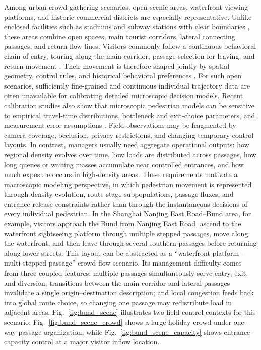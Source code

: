 \documentclass[lettersize,journal]{IEEEtran}
\begin{document}
Among urban crowd-gathering scenarios, open scenic areas, waterfront viewing platforms, and historic commercial districts are especially representative. Unlike enclosed facilities such as stadiums and subway stations with clear boundaries \cite{RN761,RN2194}, these areas combine open spaces, main tourist corridors, lateral connecting passages, and return flow lines. Visitors commonly follow a continuous behavioral chain of entry, touring along the main corridor, passage selection for leaving, and return movement \cite{RN2301}. Their movement is therefore shaped jointly by spatial geometry, control rules, and historical behavioral preferences \cite{RN2303}. For such open scenarios, sufficiently fine-grained and continuous individual trajectory data are often unavailable for calibrating detailed microscopic decision models. Recent calibration studies also show that microscopic pedestrian models can be sensitive to empirical travel-time distributions, bottleneck and exit-choice parameters, and measurement-error assumptions \cite{kretz2026empirical_travel_time_calibration,haghani2024crowd_model_calibration,king2023measurement_errors_destination_choice}. Field observations may be fragmented by camera coverage, occlusion, privacy restrictions, and changing temporary-control layouts. In contrast, managers usually need aggregate operational outputs: how regional density evolves over time, how loads are distributed across passages, how long queues or waiting masses accumulate near controlled entrances, and how much exposure occurs in high-density areas. These requirements motivate a macroscopic modeling perspective, in which pedestrian movement is represented through density evolution, route-stage subpopulations, passage fluxes, and entrance-release constraints rather than through the instantaneous decisions of every individual pedestrian. In the Shanghai Nanjing East Road--Bund area, for example, visitors approach the Bund from Nanjing East Road, ascend to the waterfront sightseeing platform through multiple stepped passages, move along the waterfront, and then leave through several southern passages before returning along lower streets. This layout can be abstracted as a ``waterfront platform--multi-stepped passage'' crowd-flow scenario. Its management difficulty comes from three coupled features: multiple passages simultaneously serve entry, exit, and diversion; transitions between the main corridor and lateral passages invalidate a single origin--destination description; and local congestion feeds back into global route choice, so changing one passage may redistribute load in adjacent areas. Fig.~\ref{fig:bund_scene} illustrates two field-control contexts for this scenario: Fig.~\ref{fig:bund_scene_crowd} shows a large holiday crowd under one-way passage organization, while Fig.~\ref{fig:bund_scene_capacity} shows entrance-capacity control at a major visitor inflow location.
\end{document}
